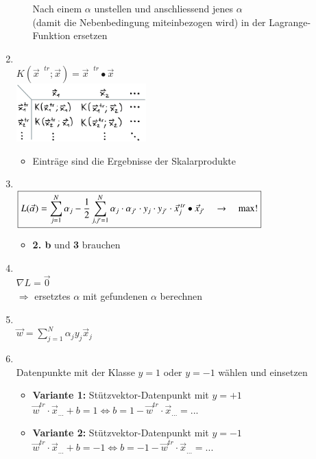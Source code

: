 \begin{enumerate}
\begin{itemize}
        Nach einem $\alpha$ unstellen und anschliessend jenes $\alpha$\\(damit die Nebenbedingung miteinbezogen wird) in der Lagrange-Funktion ersetzen
    \end{itemize}
    \item {}\\
        $\boxed{K\left( \vec{x}^{\text{ $tr$}} ; \vec{x}\right) = \vec{x}^{\text{ $tr$}} \bullet \vec{x}}$\\
        \includegraphics[width=5cm]{images/kernel_matrix.png}
        \begin{itemize}
            \item Einträge sind die Ergebnisse der Skalarprodukte
        \end{itemize}
    \item {}\\
        $\boxed{L(\vec{\alpha})=\sum_{j=1}^N\alpha_j-\frac{1}{2}\sum_{j,j'=1}^N\alpha_j \cdot \alpha_{j'} \cdot \space y_j \cdot y_{j'} \cdot \space \vec{x}_j^{\text{ $tr$}} \bullet  \vec{x}_{j'}\quad\to\quad\max!}$
        \begin{itemize}
            \item \textbf{2. b} und \textbf{3} brauchen
        \end{itemize}
    \item {}\\
            $\boxed{\nabla L = \vec{0}}$\\
            $\Rightarrow$ ersetztes $\alpha$ mit gefundenen $\alpha$ berechnen 
    \item {}\\
        $\boxed{\vec{w}=\sum_{j=1}^N\alpha_jy_j\vec{x}_j}$
    \item {}\\
        Datenpunkte mit der Klasse $y = 1$ oder $y = -1$ wählen und einsetzen
        \begin{itemize}
            \item \textbf{Variante 1:} Stützvektor-Datenpunkt mit $y = +1$\\
                $\boxed{\vec{w}^{tr}\cdot\vec{x}_{...} + b = 1} \Leftrightarrow  \boxed{b = 1 -\vec{w}^{tr}\cdot\vec{x}_{...} = ...}$
            \item \textbf{Variante 2:} Stützvektor-Datenpunkt mit $y = -1$\\
                $\boxed{\vec{w}^{tr}\cdot\vec{x}_{...} + b = -1} \Leftrightarrow  \boxed{b = -1 -\vec{w}^{tr}\cdot\vec{x}_{...} = ...}$
        \end{itemize}
\end{enumerate}


